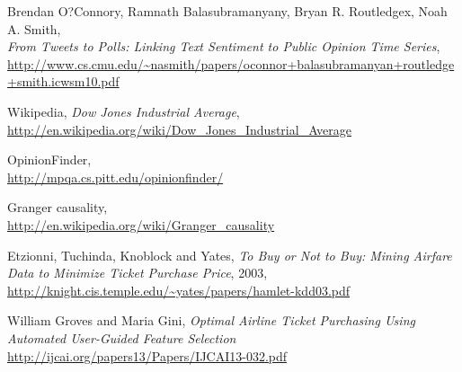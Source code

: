 \documentclass[minf,frontabs,twoside,singlespacing,parskip]{infthesis}
\begin{document}
\begin{thebibliography}{10}
	Brendan O?Connory,  Ramnath Balasubramanyany, Bryan R. Routledgex, Noah A. Smith, \\  
	\emph{From Tweets to Polls: Linking Text Sentiment to Public Opinion Time Series}, \\
	{\url{http://www.cs.cmu.edu/~nasmith/papers/oconnor+balasubramanyan+routledge+smith.icwsm10.pdf}}

	Wikipedia, \emph{Dow Jones Industrial Average}, \\
	{\url{http://en.wikipedia.org/wiki/Dow_Jones_Industrial_Average}}

	OpinionFinder, \\
	{\url{http://mpqa.cs.pitt.edu/opinionfinder/}}
	
	Granger causality, \\
	{\url{http://en.wikipedia.org/wiki/Granger_causality}}
  
 	Etzionni, Tuchinda, Knoblock and Yates, \emph{To Buy or Not to Buy: Mining Airfare Data to Minimize Ticket Purchase Price}, 2003, \\
  	{\url{http://knight.cis.temple.edu/~yates/papers/hamlet-kdd03.pdf}}
	
	William Groves and Maria Gini, \emph{Optimal Airline Ticket Purchasing Using Automated User-Guided Feature Selection} \\
	{\url{http://ijcai.org/papers13/Papers/IJCAI13-032.pdf}}

\end{thebibliography}
\end{document}

